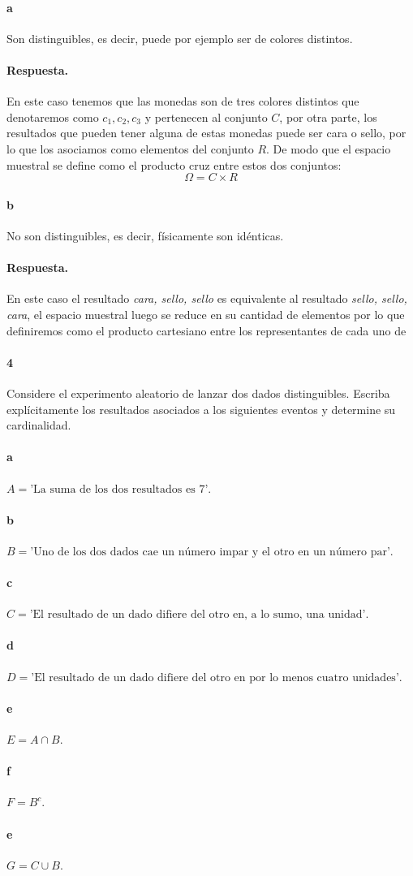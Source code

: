 \documentclass{article}
\begin{document}
\paragraph{a} Son distinguibles, es decir, puede por ejemplo ser de colores distintos.
\paragraph{Respuesta.} En este caso tenemos que las monedas son de tres colores distintos que denotaremos como $c_1, c_2, c_3$ y pertenecen al conjunto $C$, por otra parte, los resultados que pueden tener alguna de estas monedas puede ser cara o sello, por lo que los asociamos como elementos del conjunto $R$. De modo que el espacio muestral se define como el producto cruz entre estos dos conjuntos:
$$\Omega = C \times R$$
\paragraph{b}No son distinguibles, es decir, físicamente son idénticas.
\paragraph{Respuesta.} En este caso el resultado \textit{cara, sello, sello} es equivalente al resultado \textit{sello, sello, cara}, el espacio muestral luego se reduce en su cantidad de elementos por lo que definiremos como el producto cartesiano entre los representantes de cada uno de

\paragraph{4} Considere el experimento aleatorio de lanzar dos dados distinguibles. Escriba explícitamente los resultados asociados a los siguientes eventos y determine su cardinalidad.
\paragraph{a} $A = \text{'La suma de los dos resultados es 7'}$.
\paragraph{b} $B = \text{'Uno de los dos dados cae un número impar y el otro en un número par'}$.
\paragraph{c} $C = \text{'El resultado de un dado difiere del otro en, a lo sumo, una unidad'}$.
\paragraph{d} $D = \text{'El resultado de un dado difiere del otro en por lo menos cuatro unidades'}$.
\paragraph{e} $E = A \cap B$.
\paragraph{f} $F = B^{c}$.
\paragraph{e} $G = C \cup B$.
\end{document}
